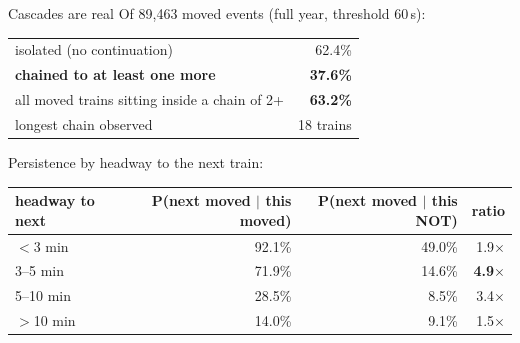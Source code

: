 \documentclass[aspectratio=169,10pt]{beamer}
\begin{document}
\begin{frame}{Cascades are real}
  Of 89{,}463 moved events (full year, threshold 60\,s):

  \vspace{0.5em}
  \centering
  \begin{tabular}{@{}lr@{}}
    \toprule
    isolated (no continuation) & 62.4\% \\
    \textbf{chained to at least one more} & \textbf{37.6\%} \\
    all moved trains sitting inside a chain of 2+ & \textbf{63.2\%} \\
    longest chain observed & 18 trains \\
    \bottomrule
  \end{tabular}

  \vspace{0.9em}
  \raggedright
  Persistence by headway to the next train:

  \vspace{0.3em}
  \centering
  \begin{tabular}{@{}lrrr@{}}
    \toprule
    headway to next & P(next moved $\mid$ this moved) & P(next moved $\mid$ this NOT) & ratio \\
    \midrule
    $<$3 min & 92.1\% & 49.0\% & 1.9$\times$ \\
    3--5 min & 71.9\% & 14.6\% & \textbf{4.9$\times$} \\
    5--10 min & 28.5\% & 8.5\% & 3.4$\times$ \\
    $>$10 min & 14.0\% & 9.1\% & 1.5$\times$ \\
    \bottomrule
  \end{tabular}
\end{frame}
\end{document}
